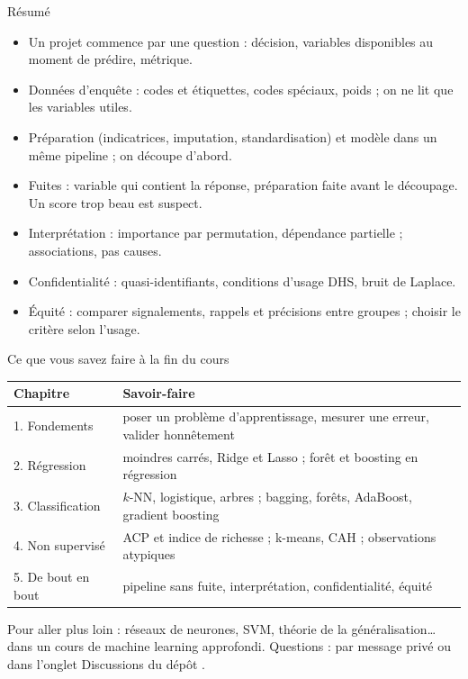 \documentclass[aspectratio=169,11pt]{beamer}
\begin{document}
\begin{frame}{Résumé}
  \begin{itemize}\small
    \item Un projet commence par une question : décision, variables disponibles au moment de prédire, métrique.
    \item Données d'enquête : codes et étiquettes, codes spéciaux, poids ; on ne lit que les variables utiles.
    \item Préparation (indicatrices, imputation, standardisation) et modèle dans un même pipeline ; on découpe d'abord.
    \item Fuites : variable qui contient la réponse, préparation faite avant le découpage. Un score trop beau est suspect.
    \item Interprétation : importance par permutation, dépendance partielle ; associations, pas causes.
    \item Confidentialité : quasi-identifiants, conditions d'usage DHS, bruit de Laplace.
    \item Équité : comparer signalements, rappels et précisions entre groupes ; choisir le critère selon l'usage.
  \end{itemize}
\end{frame}

\begin{frame}{Ce que vous savez faire à la fin du cours}
  \small
  \renewcommand{\arraystretch}{1.3}
  \begin{tabular}{p{}p{}}
    \toprule
    \textbf{Chapitre} & \textbf{Savoir-faire} \\
    \midrule
    1. Fondements & poser un problème d'apprentissage, mesurer une erreur, valider honnêtement \\
    2. Régression & moindres carrés, Ridge et Lasso ; forêt et boosting en régression \\
    3. Classification & $k$-NN, logistique, arbres ; bagging, forêts, AdaBoost, gradient boosting \\
    4. Non supervisé & ACP et indice de richesse ; k-means, CAH ; observations atypiques \\
    5. De bout en bout & pipeline sans fuite, interprétation, confidentialité, équité \\
    \bottomrule
  \end{tabular}
  \vskip3mm
  {\color{cnfGris}Pour aller plus loin : réseaux de neurones, SVM, théorie de la généralisation\dots{} dans un cours de machine learning approfondi. Questions : par message privé ou dans l'onglet Discussions du dépôt \texttt{\cnfDepot}.}
\end{frame}
\end{document}
